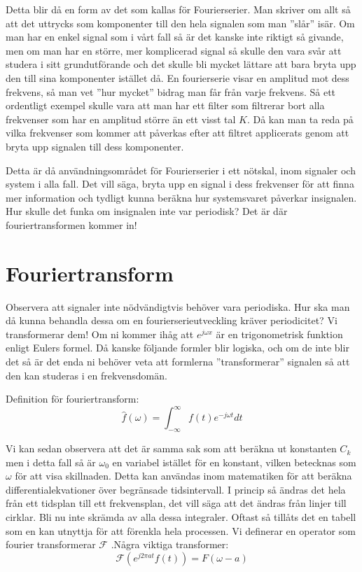 \documentclass{article}
\begin{document}
Detta blir då en form av det som kallas för Fourierserier. Man skriver om allt så att det uttrycks som komponenter till den hela signalen som man ''slår'' isär. Om man har en enkel signal som i vårt fall så är det kanske inte riktigt så givande, men om man har en större, mer komplicerad signal så skulle den vara svår att studera i sitt grundutförande och det skulle bli mycket lättare att bara bryta upp den till sina komponenter istället då. \newline
En fourierserie visar en amplitud mot dess frekvens, så man vet ''hur mycket'' bidrag man får från varje frekvens. Så ett ordentligt exempel skulle vara att man har ett filter som filtrerar bort alla frekvenser som har en amplitud större än ett visst tal $K$. Då kan man ta reda på vilka frekvenser som kommer att påverkas efter att filtret applicerats genom att bryta upp signalen till dess komponenter. \newline

Detta är då användningsområdet för Fourierserier i ett nötskal, inom signaler och system i alla fall. Det vill säga, bryta upp en signal i dess frekvenser för att finna mer information och tydligt kunna beräkna hur systemsvaret påverkar insignalen. Hur skulle det funka om insignalen inte var periodisk? \newline
Det är där fouriertransformen kommer in!

\section{Fouriertransform}
Observera att signaler inte nödvändigtvis behöver vara periodiska. Hur ska man då kunna behandla dessa om en fourierserieutveckling kräver periodicitet? Vi transformerar dem! Om ni kommer ihåg att $e^{j\omega x}$ är en trigonometrisk funktion enligt Eulers formel. Då kanske följande formler blir logiska, och om de inte blir det så är det enda ni behöver veta att formlerna ''transformerar'' signalen så att den kan studeras i en frekvensdomän.

Definition för fouriertransform:
$$\hat{f}(\omega) = \int_{-\infty}^{\infty} f(t) e^{-j \omega t} dt$$

Vi kan sedan observera att det är samma sak som att beräkna ut konstanten $C_k$ men i detta fall så är $\omega_0$ en variabel istället för en konstant, vilken betecknas som $\omega$ för att visa skillnaden. 
Detta kan användas inom matematiken för att beräkna differentialekvationer över begränsade tidsintervall. I princip så ändras det hela från ett tidsplan till ett frekvensplan, det vill säga att det ändras från linjer till cirklar. %
Bli nu inte skrämda av alla dessa integraler. Oftast så tillåts det en tabell som en kan utnyttja för att förenkla hela processen. Vi definerar en operator som fourier transformerar $\mathcal{F}$ .Några viktiga transformer:
$$\mathcal{F}(e^{j 2 \pi a t} f(t)) = F(\omega - a)$$%
\end{document}
